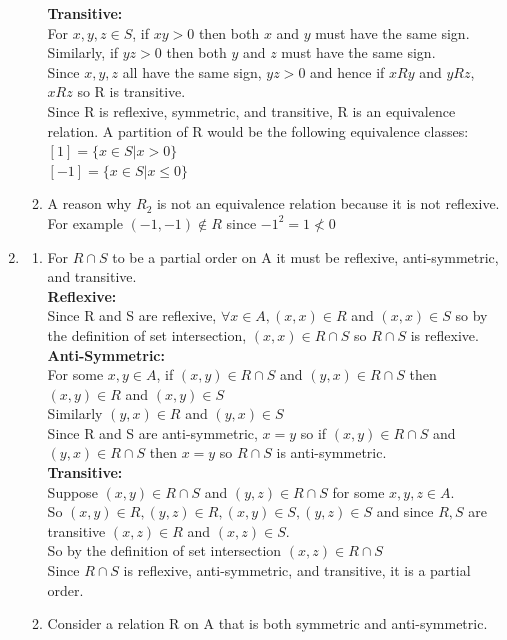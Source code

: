 \documentclass[11pt]{article}
\begin{document}
\begin{enumerate}[]
\begin{enumerate}[label=\alph*]
	\textbf{Transitive:}\\
	For $x,y,z\in S$, if $xy>0$ then both $x$ and $y$ must have the same sign. Similarly, if $yz>0$ then both $y$ and $z$ must have the same sign.\\
	Since $x,y,z$ all have the same sign, $yz>0$ and hence if $xRy$ and $yRz$, $xRz$ so R is transitive. \\
	Since R is reflexive, symmetric, and transitive, R is an equivalence relation.
	A partition of R would be the following equivalence classes:\\
	$[1] = \{x\in S | x > 0\}$\\
	$[-1] = \{x\in S | x \leq 0\}$\\
	\item A reason why $R_2$ is not an equivalence relation because it is not reflexive. For example $(-1,-1) \not\in R$ since $-1^2 = 1  \not < 0$ 
	\end{enumerate}
\item
	\begin{enumerate}[label=\alph*]
	\item For $R \cap S$ to be a partial order on A it must be reflexive, anti-symmetric, and transitive.\\
	\textbf{Reflexive:}\\
	Since R and S are reflexive, $\forall x\in A, (x,x)\in R$ and $(x,x)\in S$ so by the definition of set intersection, $(x,x)\in R\cap S$ so $R\cap S$ is reflexive.\\
	\textbf{Anti-Symmetric:}\\
	For some $x,y\in A$, if $(x,y)\in R\cap S$ and $(y,x)\in R\cap S$ then $(x,y)\in R$ and $(x,y)\in S$\\
	Similarly $(y,x)\in R$ and $(y,x)\in S$\\
	Since R and S are anti-symmetric, $x=y$ so if $(x,y)\in R\cap S$ and $(y,x)\in R\cap S$ then $x=y$ so $R\cap S$ is anti-symmetric.\\
	\textbf{Transitive:}\\
	Suppose $(x,y)\in R\cap S$ and $(y,z)\in R\cap S$ for some $x,y,z\in A$.\\
	So $(x,y)\in R, (y,z)\in R, (x,y)\in S, (y,z)\in S$ and since $R,S$ are transitive $(x,z)\in R$ and $(x,z)\in S$.\\
	So by the definition of set intersection $(x,z)\in R\cap S$\\
	Since $R\cap S$ is 	reflexive, anti-symmetric, and transitive, it is a partial order.
	\item
	Consider a relation R on A that is both symmetric and anti-symmetric.\\

\end{enumerate}
\end{enumerate}
\end{document}

